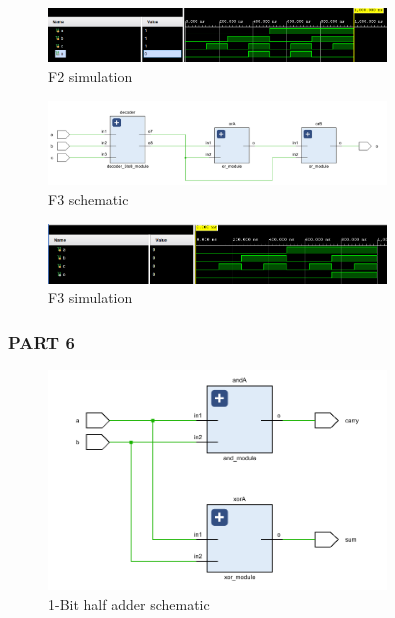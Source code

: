 \documentclass[pdftex,12pt,a4paper]{article}
\begin{document}
    \begin{figure}[H]
    	\centering
    	\includegraphics[width=0.8\textwidth]{simulations/F2_sim.png}	
    	\caption{F2 simulation}
    	\label{F2 simulation}
    \end{figure}
    
    \begin{figure}[H]
    	\centering
    	\includegraphics[width=0.8\textwidth]{schematic/F3_schematic.png}	
    	\caption{F3 schematic}
    	\label{F3 schematic}
    \end{figure}
    
    \begin{figure}[H]
    	\centering
    	\includegraphics[width=0.8\textwidth]{simulations/F3_sim.png}	
    	\caption{F3 simulation}
    	\label{F3 simulation}
    \end{figure}
\subsubsection{PART 6}
    \begin{figure}[H]
    	\centering
    	\includegraphics[width=0.8\textwidth]{schematic/half_bit_adder_schem.png}	
    	\caption{1-Bit half adder schematic}
    	\label{1-Bit half adder schematic}
    \end{figure}
    
\end{document}
